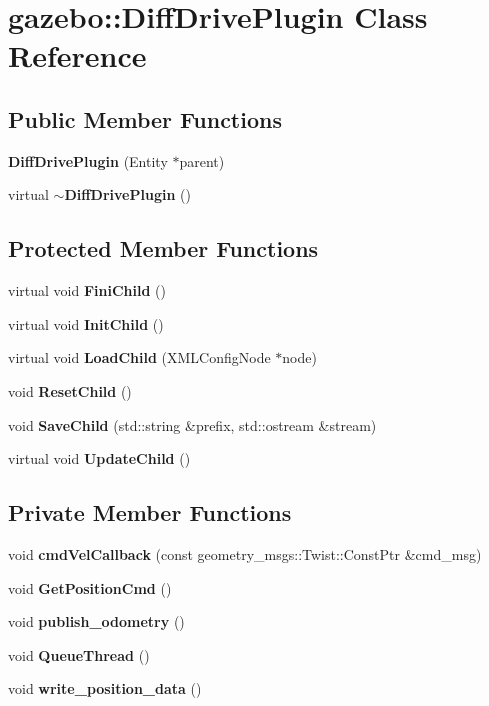 \section{gazebo::DiffDrivePlugin Class Reference}
\label{classgazebo_1_1DiffDrivePlugin}
\subsection*{Public Member Functions}
\begin{DoxyCompactItemize}
\item 
{\bf DiffDrivePlugin} (Entity $\ast$parent)
\item 
virtual {\bf $\sim$DiffDrivePlugin} ()
\end{DoxyCompactItemize}
\subsection*{Protected Member Functions}
\begin{DoxyCompactItemize}
\item 
virtual void {\bf FiniChild} ()
\item 
virtual void {\bf InitChild} ()
\item 
virtual void {\bf LoadChild} (XMLConfigNode $\ast$node)
\item 
void {\bf ResetChild} ()
\item 
void {\bf SaveChild} (std::string \&prefix, std::ostream \&stream)
\item 
virtual void {\bf UpdateChild} ()
\end{DoxyCompactItemize}
\subsection*{Private Member Functions}
\begin{DoxyCompactItemize}
\item 
void {\bf cmdVelCallback} (const geometry\_\-msgs::Twist::ConstPtr \&cmd\_\-msg)
\item 
void {\bf GetPositionCmd} ()
\item 
void {\bf publish\_\-odometry} ()
\item 
void {\bf QueueThread} ()
\item 
void {\bf write\_\-position\_\-data} ()
\end{DoxyCompactItemize}
